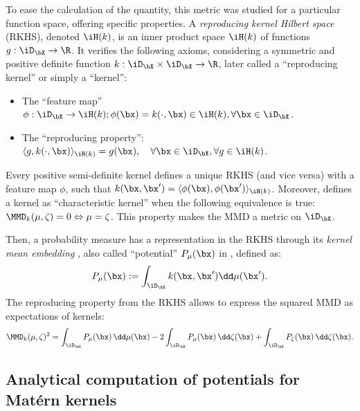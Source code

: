 To ease the calculation of the quantity, this metric was studied for a particular function space, offering specific properties.
A \emph{reproducing kernel Hilbert space} (RKHS), denoted $\iH(k)$, is an inner product space $\iH(k)$ of functions $g:\iD_{\bX} \rightarrow \R$.
It verifies the following axioms, considering a symmetric and positive definite function $k: \iD_{\bX} \times \iD_{\bX} \rightarrow \R$, later called a ``reproducing kernel'' or simply a ``kernel'': 
\begin{itemize}
    \item The ``feature map'' $\phi : \iD_{\bX} \to \iH(k); \phi(\bx) = k(\cdot, \bx) \in \iH(k), \forall \bx \in \iD_{\bX}$.
    \item The ``reproducing property'': $\langle g, k(\cdot, \bx) \rangle_{\iH(k)} = g(\bx), \quad \forall \bx \in \iD_{\bX}, \forall g \in \iH(k)$.
\end{itemize}
Every positive semi-definite kernel defines a unique RKHS (and vice versa) with a feature map $\phi$, such that $k(\bx, \bx') = \langle \phi(\bx), \phi(\bx') \rangle_{\iH(k)}$.
Moreover, \cite{sriperumbudur_2010} defines a kernel as ``characteristic kernel'' when the following equivalence is true: $\MMD_k(\mu, \zeta) = 0 \Leftrightarrow \mu = \zeta$. 
This property makes the MMD a metric on $\iD_{\bX}$.

Then, a probability measure has a representation in the RKHS through its \emph{kernel mean embedding} \citep{sejdinovic_2013}, also called ``potential'' $P_{\mu}(\bx)$ in \cite{pronzato_zhigljavsky_2020}, defined as:
\begin{equation}
   P_{\mu}(\bx) := \int_{\iD_{\bX}} k(\bx, \bx') \dd \mu(\bx').
\end{equation}
The reproducing property from the RKHS allows to express the squared MMD as expectations of kernels:
\begin{equation}\label{eq:mmd2}
    \MMD_k(\mu, \zeta)^2 = \int_{\iD_{\bX}} P_{\mu}(\bx)\, \dd\mu(\bx) - 2 \int_{\iD_{\bX}} P_{\mu}(\bx) \, \dd\zeta(\bx) + \int_{\iD_{\bX}} P_{\zeta}(\bx)\, \dd\zeta(\bx).
\end{equation}



\subsection*{Analytical computation of potentials for Mat\'ern kernels}

